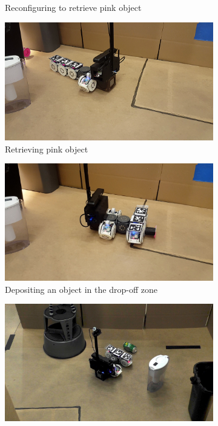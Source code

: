 \documentclass[conference]{IEEEtran}
\begin{document}
\begin{figure}[t]
\begin{subfigure}[t]{0.32\textwidth}
        \caption{Reconfiguring to retrieve pink object}
    \end{subfigure}
    \begin{subfigure}[t]{0.32\textwidth}
        \includegraphics[width=\textwidth]{images/pink_retrieval.png}
        \caption{Retrieving pink object}
        \label{fig:pink_grab}
    \end{subfigure}
    \begin{subfigure}[t]{0.32\textwidth}
        \includegraphics[width=\textwidth]{images/dropoff.jpg}
        \caption{Depositing an object in the drop-off zone}
        \label{fig:dropoff}
    \end{subfigure}
    \begin{subfigure}[t]{0.32\textwidth}
        \includegraphics[width=\textwidth]{images/green_retrieval.jpg}

\end{subfigure}
\end{figure}
\end{document}
